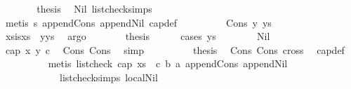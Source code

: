 \begin{isabellebody}
\ \ \ \ \isamarkupfalse%
\ \isamarkupfalse%
\ {\isacharquery}{\kern0pt}thesis\ \isamarkupfalse%
\ Nil\ list{\isacharunderscore}{\kern0pt}check{\isachardot}{\kern0pt}simps{\isacharparenleft}{\kern0pt}{}{\isacharparenright}{\kern0pt}\ \isanewline
\ \ \ \ \ \ \isamarkupfalse%
\ {\isacharparenleft}{\kern0pt}metis\ s{}\ append{\isacharunderscore}{\kern0pt}Cons\ append{\isacharunderscore}{\kern0pt}Nil\ cap{}{\isacharunderscore}{\kern0pt}def{\isacharparenright}{\kern0pt}\ \isanewline
\ \ \isamarkupfalse%
\isanewline
\ \ \ \ \isamarkupfalse%
\ {\isacharparenleft}{\kern0pt}Cons\ y\ ys{\isacharparenright}{\kern0pt}\isanewline
\ \ \ \ \isamarkupfalse%
\ xs{\isacharunderscore}{\kern0pt}is{\isacharcolon}{\kern0pt}{\isachardoublequoteopen}xs\ {\isacharequal}{\kern0pt}\ y{\isacharhash}{\kern0pt}ys{\isachardoublequoteclose}\ \isamarkupfalse%
\ argo\isanewline
\ \ \ \ \isamarkupfalse%
\ \isamarkupfalse%
\ {\isacharquery}{\kern0pt}thesis\ \isanewline
\ \ \ \ \isamarkupfalse%
{\isacharparenleft}{\kern0pt}cases\ ys{\isacharparenright}{\kern0pt}\isanewline
\ \ \ \ \ \ \isamarkupfalse%
\ Nil\isanewline
\ \ \ \ \ \ \isamarkupfalse%
\ {\isachardoublequoteopen}cap{}\ x\ y\ c{\isachardoublequoteclose}\ \isamarkupfalse%
\ Cons\ Cons{}\ \isamarkupfalse%
\ simp\isanewline
\ \ \ \ \ \ \isamarkupfalse%
\ \isamarkupfalse%
\ {\isacharquery}{\kern0pt}thesis\ \isamarkupfalse%
\ Cons\ Cons{}\ cross{}\ \isamarkupfalse%
\ cap{}{\isacharunderscore}{\kern0pt}def\ \isanewline
\ \ \ \ \ \ \ \ \isamarkupfalse%
\ {\isacharparenleft}{\kern0pt}metis\ {\isacartoucheopen}list{\isacharunderscore}{\kern0pt}check\ cap{}\ {\isacharparenleft}{\kern0pt}xs\ {\isacharat}{\kern0pt}\ {\isacharbrackleft}{\kern0pt}c{\isacharcomma}{\kern0pt}\ b{\isacharcomma}{\kern0pt}\ a{\isacharbrackright}{\kern0pt}{\isacharparenright}{\kern0pt}{\isacartoucheclose}\ append{\isacharunderscore}{\kern0pt}Cons\ append{\isacharunderscore}{\kern0pt}Nil\isanewline
\ \ \ \ \ \ \ \ \ \ \ \ list{\isacharunderscore}{\kern0pt}check{\isachardot}{\kern0pt}simps{\isacharparenleft}{\kern0pt}{}{\isacharcomma}{\kern0pt}{}{\isacharparenright}{\kern0pt}\ local{\isachardot}{\kern0pt}Nil{\isacharparenright}{\kern0pt}\ \isanewline

\end{isabellebody}
